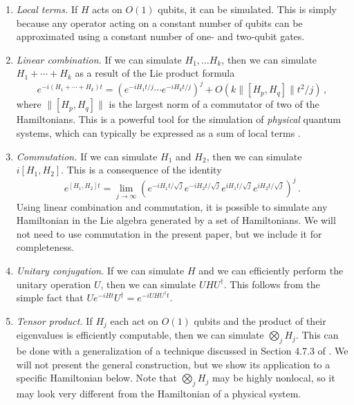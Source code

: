 \documentclass[aps,11pt,twoside,nofootinbib,tightenlines,superscriptaddress,preprintnumbers]{revtex4}
\newcommand{\<}{\langle}
\renewcommand{\>}{\rangle}
\newcommand{\be}{\begin{equation}}
\newcommand{\ee}{\end{equation}}
\begin{document}
\begin{enumerate}
\item {\em Local terms.}  If $H$ acts on $O(1)$ qubits, it can be
simulated.  This is simply because any operator acting on a constant
number of qubits can be approximated using a constant number of one- and
two-qubit gates.
\label{sim:local}

\item {\em Linear combination.}  If we can simulate $H_1, \ldots H_k$,
then we can simulate $H_1 + \cdots + H_k$ as a result of the Lie product
formula
\be
  e^{-i(H_1+\cdots+H_k)t}
    = \left(e^{-i H_1 t/j} \cdots e^{-i H_k t/j}\right)^j 
      + O(k \|[H_p,H_q]\| t^2 / j)
\,,
\label{eq:lie}
\ee
where $\|[H_p,H_q]\|$ is the largest norm of a commutator of two of the
Hamiltonians.  This is a powerful tool for the simulation of {\em
physical} quantum systems, which can typically be expressed as a sum of
local terms \cite{Llo96}.
\label{sim:linear}

\item {\em Commutation.}  If we can simulate $H_1$ and $H_2$, then we can
simulate $i[H_1,H_2]$.  This is a consequence of the identity
\be
  e^{[H_1,H_2]t} = \lim_{j \to \infty} 
    \left(e^{-i H_1 t/\sqrt j} e^{-i H_2 t/\sqrt j} 
          e^{ i H_1 t/\sqrt j} e^{ i H_2 t/\sqrt j}\right)^j
\,.
\ee
Using linear combination and commutation, it is possible to simulate any
Hamiltonian in the Lie algebra generated by a set of Hamiltonians.  We
will not need to use commutation in the present paper, but we include it
for completeness.
\label{sim:comm}

\item {\em Unitary conjugation.}  If we can simulate $H$ and we can
efficiently perform the unitary operation $U$, then we can simulate $U H
U^\dag$.  This follows from the simple fact that $U e^{-i H t} U^\dag =
e^{-i U H U^\dag t}$.
\label{sim:unitary}

\item {\em Tensor product.}  If $H_j$ each act on $O(1)$ qubits and the
product of their eigenvalues is efficiently computable, then we can
simulate $\bigotimes_j H_j$.  This can be done with a generalization of a
technique discussed in Section 4.7.3 of \cite{NC00}.  We will not present
the general construction, but we show its application to a specific
Hamiltonian below.  Note that $\bigotimes_j H_j$ may be highly nonlocal,
so it may look very different from the Hamiltonian of a physical system.
\label{sim:tensor}
\end{enumerate}
\end{document}
